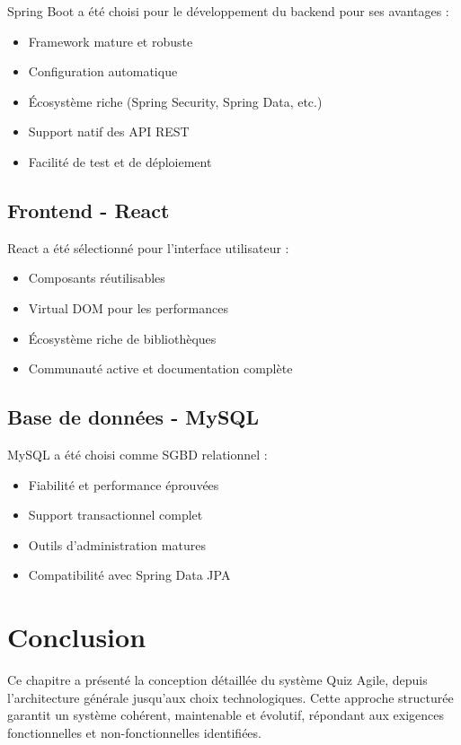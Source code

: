 \documentclass[12pt,a4paper]{report}
\begin{document}
Spring Boot a été choisi pour le développement du backend pour ses avantages :

\begin{itemize}
    \item Framework mature et robuste
    \item Configuration automatique
    \item Écosystème riche (Spring Security, Spring Data, etc.)
    \item Support natif des API REST
    \item Facilité de test et de déploiement
\end{itemize}

\subsection{Frontend - React}

React a été sélectionné pour l'interface utilisateur :

\begin{itemize}
    \item Composants réutilisables
    \item Virtual DOM pour les performances
    \item Écosystème riche de bibliothèques
    \item Communauté active et documentation complète
\end{itemize}

\subsection{Base de données - MySQL}

MySQL a été choisi comme SGBD relationnel :

\begin{itemize}
    \item Fiabilité et performance éprouvées
    \item Support transactionnel complet
    \item Outils d'administration matures
    \item Compatibilité avec Spring Data JPA
\end{itemize}

\section{Conclusion}

Ce chapitre a présenté la conception détaillée du système Quiz Agile, depuis l'architecture générale jusqu'aux choix technologiques. Cette approche structurée garantit un système cohérent, maintenable et évolutif, répondant aux exigences fonctionnelles et non-fonctionnelles identifiées.
\end{document}
